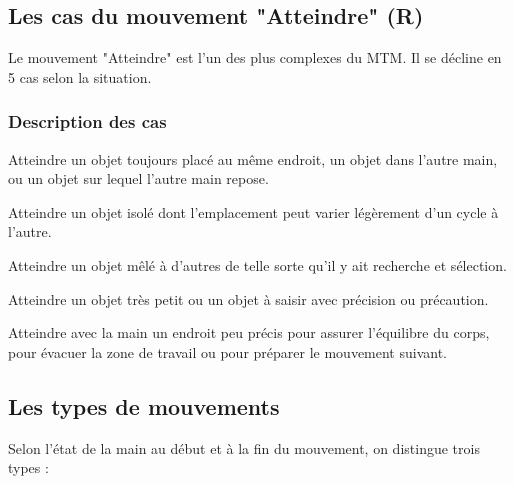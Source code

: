 \documentclass[a4paper,12pt]{article}
\begin{document}
\subsection{Les cas du mouvement "Atteindre" (R)}

Le mouvement "Atteindre" est l'un des plus complexes du MTM. Il se décline en 5 cas selon la situation.

\subsubsection{Description des cas}

\begin{description}[labelwidth=1.5cm]
    \item[R-A] Atteindre un objet toujours placé au même endroit, un objet dans l'autre main, ou un objet sur lequel l'autre main repose.
    
    \item[R-B] Atteindre un objet isolé dont l'emplacement peut varier légèrement d'un cycle à l'autre.
    
    \item[R-C] Atteindre un objet mêlé à d'autres de telle sorte qu'il y ait recherche et sélection.
    
    \item[R-D] Atteindre un objet très petit ou un objet à saisir avec précision ou précaution.
    
    \item[R-E] Atteindre avec la main un endroit peu précis pour assurer l'équilibre du corps, pour évacuer la zone de travail ou pour préparer le mouvement suivant.
\end{description}

\subsection{Les types de mouvements}

Selon l'état de la main au début et à la fin du mouvement, on distingue trois types :
\end{document}
